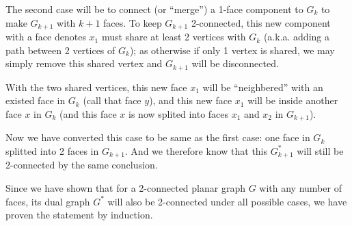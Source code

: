 \documentclass[11pt]{article}
\begin{document}
The second case will be to connect (or ``merge'') a 1-face component to $G_k$ to make $G_{k+1}$ with $k+1$ faces. To keep $G_{k+1}$ 2-connected, this new component with a face denotes $x_1$ must share at least 2 vertices with $G_k$ (a.k.a. adding a path between 2 vertices of  $G_k$); as otherwise if only 1 vertex is shared, we may simply remove this shared vertex and $G_{k+1}$ will be disconnected.

With the two shared vertices, this new face $x_1$ will be ``neighbered'' with an existed face in $G_k$ (call that face $y$), and this new face $x_1$ will be inside another face $x$ in $G_k$ (and this face $x$ is now splited into faces $x_1$ and $x_2$ in $G_{k+1}$).

Now we have converted this case to be same as the first case: one face in $G_k$ splitted into 2 faces in $G_{k+1}$. And we therefore know that this $G^*_{k+1}$ will still be 2-connected by the same conclusion.\newline

Since we have shown that for a 2-connected planar graph $G$ with any number of faces, its dual graph $G^*$ will also be 2-connected under all possible cases, we have proven the statement by induction.





%
% 
% 
\end{document}

